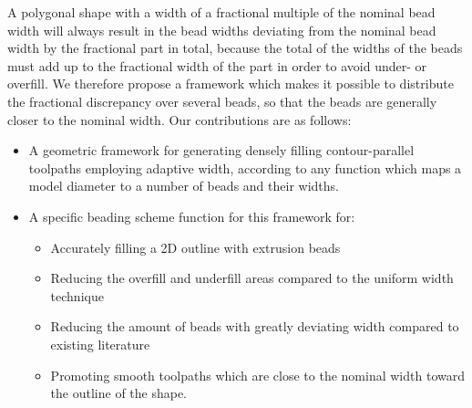 A polygonal shape with a width of a fractional multiple of the nominal bead width will always result in the bead widths deviating from the nominal bead width by the fractional part in total,
because the total of the widths of the beads must add up to the fractional width of the part in order to avoid under- or overfill.
We therefore propose a framework which makes it possible to distribute the fractional discrepancy over several beads, so that the beads are generally closer to the nominal width.
Our contributions are as follows:
\begin{itemize}
\item A geometric framework for generating densely filling contour-parallel toolpaths employing adaptive width, according to any function which maps a model diameter to a number of beads and their widths.
\item A specific beading scheme function for this framework for:
\begin{itemize}
\item Accurately filling a 2D outline with extrusion beads
\item Reducing the overfill and underfill areas compared to the uniform width technique
\item Reducing the amount of beads with greatly deviating width compared to existing literature
\item Promoting smooth toolpaths which are close to the nominal width toward the outline of the shape.
\end{itemize}
\end{itemize}




